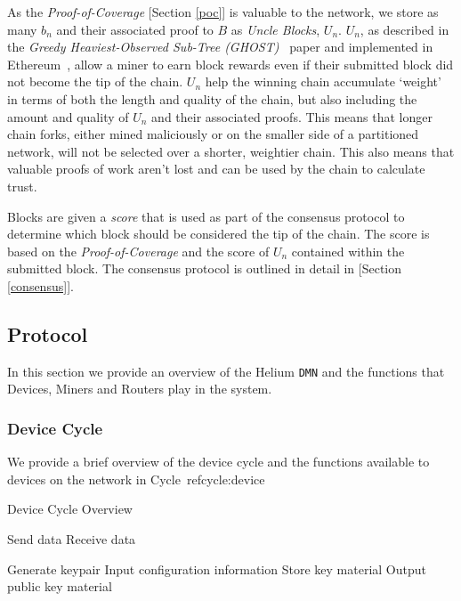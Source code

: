 \documentclass[10pt, nonatbib, nocopyrightspace, reprint]{sigplanconf}
\begin{document}
As the \emph{Proof-of-Coverage} [Section \ref{poc}] is valuable to the network, we store as many $b_n$ and their associated proof to $B$ as \emph{Uncle Blocks}, $U_n$. $U_n$, as described in the \emph{Greedy Heaviest-Observed Sub-Tree (GHOST)}~\cite{ghost} paper and implemented in Ethereum~\cite{ethereum}, allow a miner to earn block rewards even if their submitted block did not become the tip of the chain. $U_n$ help the winning chain accumulate `weight' in terms of both the length and quality of the chain, but also including the amount and quality of $U_n$ and their associated proofs. This means that longer chain forks, either mined maliciously or on the smaller side of a partitioned network, will not be selected over a shorter, weightier chain. This also means that valuable proofs of work aren't lost and can be used by the chain to calculate trust.

Blocks are given a \emph{score} that is used as part of the consensus protocol to determine which block should be considered the tip of the chain. The score is based on the \emph{Proof-of-Coverage} and the score of $U_n$ contained within the submitted block. The consensus protocol is outlined in detail in [Section \ref{consensus}].


\subsection{Protocol}

In this section we provide an overview of the Helium \verb|DMN| and the functions that Devices, Miners and Routers play in the system.


\subsubsection{Device Cycle}

We provide a brief overview of the device cycle and the functions available to devices on the network in Cycle~ref{cycle:device}

\begin{algorithm}[!htb]
  \DontPrintSemicolon
  \caption{Device Cycle Overview}\label{cycle:device}

   {
    Send data \;
    Receive data \;
  }

   {
    Generate keypair \;
    Input configuration information \;
    Store key material \;
    Output public key material \;
  }
\end{algorithm}
\FloatBarrier
\end{document}
